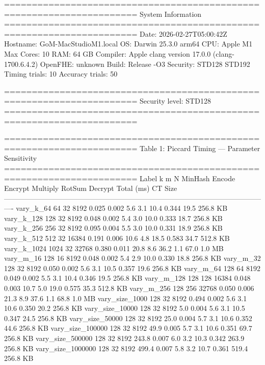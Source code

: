 ======================================================================
  System Information
======================================================================
Date:     2026-02-27T05:00:42Z
Hostname: GoM-MacStudioM1.local
OS:       Darwin 25.3.0 arm64
CPU:      Apple M1 Max
Cores:    10
RAM:      64 GB
Compiler: Apple clang version 17.0.0 (clang-1700.6.4.2)
OpenFHE:  unknown
Build:    Release -O3
Security: STD128 STD192
Timing trials:   10
Accuracy trials: 50


======================================================================
  Security level: STD128
======================================================================

======================================================================
  Table 1: Piccard Timing — Parameter Sensitivity
======================================================================
              Label     k    m      N  MinHash  Encode  Encrypt  Multiply  RotSum  Decrypt  Total (ms)   CT Size
----------------------------------------------------------------------------------------------------------------
          vary_k_64    64   32   8192    0.025   0.002      5.6       3.1    10.4    0.344        19.5  256.8 KB
         vary_k_128   128   32   8192    0.048   0.002      5.4       3.0    10.0    0.333        18.7  256.8 KB
         vary_k_256   256   32   8192    0.095   0.004      5.5       3.0    10.0    0.331        18.9  256.8 KB
         vary_k_512   512   32  16384    0.191   0.006     10.6       4.8    18.5    0.583        34.7  512.8 KB
        vary_k_1024  1024   32  32768    0.380   0.011     20.8       8.6    36.2      1.1        67.0    1.0 MB
          vary_m_16   128   16   8192    0.048   0.002      5.4       2.9    10.0    0.330        18.8  256.8 KB
          vary_m_32   128   32   8192    0.050   0.002      5.6       3.1    10.5    0.357        19.6  256.8 KB
          vary_m_64   128   64   8192    0.049   0.002      5.5       3.1    10.4    0.346        19.5  256.8 KB
         vary_m_128   128  128  16384    0.048   0.003     10.7       5.0    19.0    0.575        35.3  512.8 KB
         vary_m_256   128  256  32768    0.050   0.006     21.3       8.9    37.6      1.1        68.8    1.0 MB
     vary_size_1000   128   32   8192    0.494   0.002      5.6       3.1    10.6    0.350        20.2  256.8 KB
    vary_size_10000   128   32   8192      5.0   0.004      5.6       3.1    10.5    0.347        24.5  256.8 KB
    vary_size_50000   128   32   8192     25.0   0.004      5.7       3.1    10.6    0.352        44.6  256.8 KB
   vary_size_100000   128   32   8192     49.9   0.005      5.7       3.1    10.6    0.351        69.7  256.8 KB
   vary_size_500000   128   32   8192    243.8   0.007      6.0       3.2    10.3    0.342       263.9  256.8 KB
  vary_size_1000000   128   32   8192    499.4   0.007      5.8       3.2    10.7    0.361       519.4  256.8 KB

